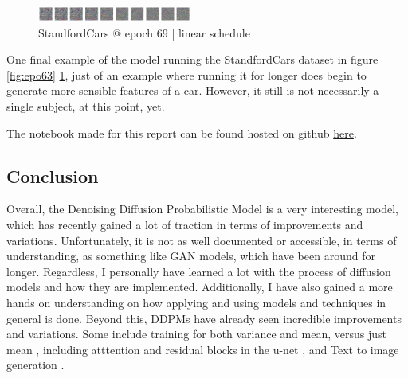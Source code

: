 \documentclass[conference]{IEEEtran}
\begin{document}
\begin{figure}[htbp]
    \centering
    \includegraphics[width=0.45\textwidth]{../images/epoch69.png}
    \caption{StandfordCars @ epoch 69 | linear schedule}
    \label{fig:epo69}
\end{figure}

One final example of the model running the StandfordCars dataset in figure
\ref{fig:epo63} \ref{fig:epo69}, just of an example where running it for longer
does begin to generate more sensible features of a car. However, it still is
not necessarily a single subject, at this point, yet.

The notebook made for this report can be found hosted on github
\href{https://github.com/LeHuman/CS-584-Project/blob/main/simple_ddpm.ipynb}{here}.

\subsection{Conclusion}

Overall, the Denoising Diffusion Probabilistic Model is a very interesting
model, which has recently gained a lot of traction in terms of improvements and
variations. Unfortunately, it is not as well documented or accessible, in terms
of understanding, as something like GAN models, which have been around for
longer. Regardless, I personally have learned a lot with the process of
diffusion models and how they are implemented. Additionally, I have also gained
a more hands on understanding on how applying and using models and techniques
in general is done. Beyond this, DDPMs have already seen incredible
improvements and variations. Some include training for both variance and mean,
versus just mean \cite{nichol2021improved}, including atttention and residual
blocks in the u-net \cite{hugimpl}, and Text to image generation
\cite{saharia2022photorealistic}.

\newpage



\end{document}
